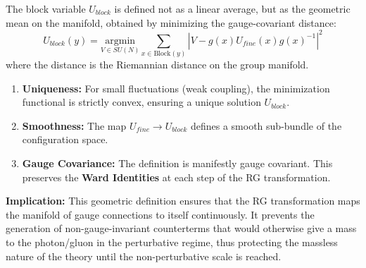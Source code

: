 \begin{definition}
The block variable $U_{block}$ is defined not as a linear average, but as the geometric mean on the manifold, obtained by minimizing the gauge-covariant distance:
\begin{equation}
U_{block}(y) = \underset{V \in SU(N)}{\text{argmin}} \sum_{x \in \text{Block}(y)} \left| V - g(x) U_{fine}(x) g(x)^{-1} \right|^2
\end{equation}
where the distance is the Riemannian distance on the group manifold.
\end{definition}

\begin{theorem}
\begin{enumerate}
    \item \textbf{Uniqueness:} For small fluctuations (weak coupling), the minimization functional is strictly convex, ensuring a unique solution $U_{block}$.
    \item \textbf{Smoothness:} The map $U_{fine} \to U_{block}$ defines a smooth sub-bundle of the configuration space.
    \item \textbf{Gauge Covariance:} The definition is manifestly gauge covariant. This preserves the \textbf{Ward Identities} at each step of the RG transformation.
\end{enumerate}
\end{theorem}

\textbf{Implication:} This geometric definition ensures that the RG transformation maps the manifold of gauge connections to itself continuously. It prevents the generation of non-gauge-invariant counterterms that would otherwise give a mass to the photon/gluon in the perturbative regime, thus protecting the massless nature of the theory until the non-perturbative scale is reached.


